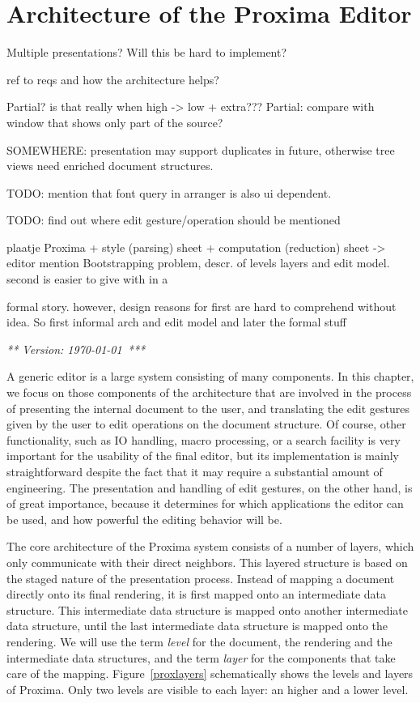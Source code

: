 \chapter{Architecture of the Proxima Editor}
\label{chap:proxArch}

\bc
Multiple presentations? Will this be hard to implement?

ref to reqs and how the architecture helps?

Partial? is that really when high -> low + extra???
Partial: compare with window that shows only part of the source?

SOMEWHERE: presentation may support duplicates in future, otherwise tree views need enriched 
 document structures.

TODO: mention that font query in arranger is also ui dependent.

TODO: find out where edit gesture/operation should be mentioned

plaatje Proxima + style (parsing) sheet + computation (reduction) sheet -> editor mention Bootstrapping problem, descr. of levels layers and edit model. second is easier to give with in a

formal story. however, design reasons for first are hard to comprehend without idea. So first informal arch 
 and edit model and later the formal stuff
\ec


{\em *** Version: \today~***}



A generic editor is a large system consisting of many components. In this chapter, we focus on those components of the architecture that are involved in the process of presenting the internal document to the user, and translating the edit gestures given by the user to edit operations on the document structure. Of course, other functionality, such as IO handling, macro processing, or a search facility is very important for the usability of the final editor, but its implementation is mainly straightforward despite the fact that it may require a substantial amount of engineering. The presentation and handling of edit gestures, on the other hand, is of great importance, because it determines for which applications the editor can be used, and how powerful the editing behavior will be.

The core architecture of the Proxima system consists of a number of layers, which only communicate with their direct neighbors. This layered structure is based on the staged nature of the presentation process. Instead of mapping a document directly onto its final rendering, it is first mapped onto an intermediate data structure. This intermediate data structure is mapped onto another intermediate data structure, until the last intermediate data structure is mapped onto the rendering. We will use the term {\em level} for the document, the rendering and the intermediate data structures, and the term {\em layer} for the components that take care of the mapping. Figure~\ref{proxlayers} schematically shows the levels and layers of Proxima. Only two levels are visible to each layer: an higher and a lower level.


